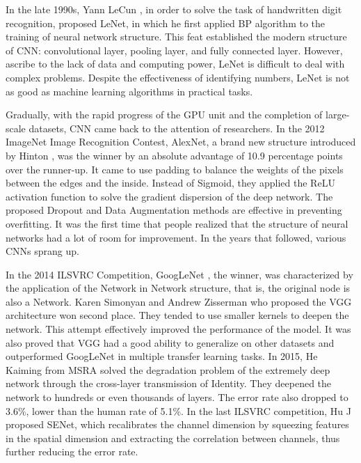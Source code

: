 \documentclass[10pt,twocolumn,letterpaper]{article}
\begin{document}
	In the late 1990s, Yann LeCun \etal \cite{lecun}, in order to solve the task of handwritten digit recognition, proposed LeNet, in which he first applied BP algorithm to the training of neural network structure. This feat established the modern structure of CNN: convolutional layer, pooling layer, and fully connected layer. However, ascribe to the lack of data and computing power, LeNet is difficult to deal with complex problems. Despite the effectiveness of identifying numbers, LeNet is not as good as machine learning algorithms in practical tasks.

	Gradually, with the rapid progress of the GPU unit and the completion of large-scale datasets, CNN came back to the attention of researchers. In the 2012 ImageNet Image Recognition Contest, AlexNet, a brand new structure introduced by Hinton \etal \cite{alexnet}, was the winner by an absolute advantage of 10.9 percentage points over the runner-up. It came to use padding to balance the weights of the pixels between the edges and the inside. Instead of Sigmoid, they applied the ReLU \cite{relu} activation function to solve the gradient dispersion of the deep network. The proposed Dropout and Data Augmentation methods \cite{alexnet} are effective in preventing overfitting. It was the first time that people realized that the structure of neural networks had a lot of room for improvement. In the years that followed, various CNNs sprang up.

	In the 2014 ILSVRC Competition, GoogLeNet \cite{googlenet}, the winner, was characterized by the application of the Network in Network structure, that is, the original node is also a Network. Karen Simonyan and Andrew Zisserman \cite{vgg} who proposed the VGG architecture won second place. They tended to use smaller kernels to deepen the network. This attempt effectively improved the performance of the model. It was also proved that VGG had a good ability to generalize on other datasets and outperformed GoogLeNet in multiple transfer learning tasks. In 2015, He Kaiming \etal \cite{resnet} from MSRA solved the degradation problem of the extremely deep network through the cross-layer transmission of Identity. They deepened the network to hundreds or even thousands of layers. The error rate also dropped to 3.6\%, lower than the human rate of 5.1\%. In the last ILSVRC competition, Hu J \etal \cite{senet} proposed SENet, which recalibrates the channel dimension by squeezing features in the spatial dimension and extracting the correlation between channels, thus further reducing the error rate.
\end{document}
